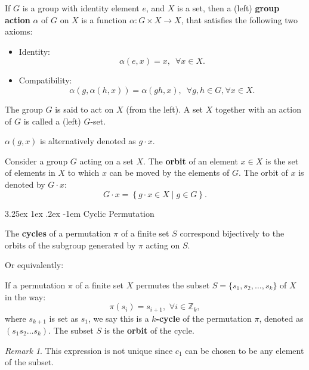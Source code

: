 \documentclass[12pt, letterpaper]{article}
\makeatletter
\newcommand{\inte}{\mathbb{Z}}
\renewcommand\paragraph{\@startsection{paragraph}{4}{\z@}%
	{3.25ex \@plus1ex \@minus.2ex}%
	{-1em}%
	{\normalfont\normalsize\bfseries}}
\theoremstyle{definition}
\theoremstyle{remark}
\newtheorem*{rem*}{Remark}
\theoremstyle{definition}
\theoremstyle{plain}
\numberwithin{equation}{section}
\makeatother
\begin{document}
	\begin{def*}
		If $G$ is a group with identity element $e$, and $X$ is a set, then a (left) \textbf{group action} $\alpha$ of $G$ on $X$ is a function
		$\alpha \colon G\times X\to X$,
		that satisfies the following two axioms:
		\begin{itemize}
			\item Identity:	\[\alpha (e,x)=x,\,\,\,\forall x \in X.\]
			\item Compatibility:\[\alpha \left(g,\alpha \left(h,x\right)\right)=\alpha \left(gh,x\right),\,\,\,\forall g,h\in G,\forall x\in X.\]
		\end{itemize}
		The group $G$ is said to act on $X$ (from the left).
		A set $X$ together with an action of $G$ is called a (left) $G$-set.
	\end{def*}
	$\alpha(g,x)$ is alternatively denoted as $g\cdot x$.
	\begin{def*}[orbit]
		Consider a group $G$ acting on a set $X$.
		The \textbf{orbit} of an element $x\in X$
		is the set of elements in $X$ to which $x$ can be moved by the elements of $G$.
		The orbit of $x$ is denoted by $G\cdot x$:
		\[G\cdot x=\left\{g\cdot x\in X\mid g\in G\right\}.\]
	\end{def*}
	
	
	
	\paragraph{Cyclic Permutation}
	\begin{def*}[cycle]
		The \textbf{cycles} of a permutation $\pi$ of a finite set $S$ correspond bijectively 
		to the orbits of the subgroup generated by $\pi$ acting on $S$.
	\end{def*}

	Or equivalently:
	\begin{def*}[k-cycle]
		If a permutation $\pi$ of a finite set $X$ permutes
		the subset $S=\{s_1,s_2,\dots,s_k\}$ of $X$ in the way:
		\[\pi(s_i)=s_{i+1}, \,\, \forall i \in \inte_{k}, \]
		where $s_{k+1}$ is set as $s_1$,
		we say this is a \textbf{$k$-cycle} of the permutation $\pi$,
		denoted as $( s_1 s_2 \dots s_k )$.
		The subset $S$ is the \textbf{orbit} of the cycle.
	\end{def*}

	\begin{rem*}
		This expression is not unique since $c_1$ can be chosen to be any element of the subset.
	\end{rem*}
\end{document}
